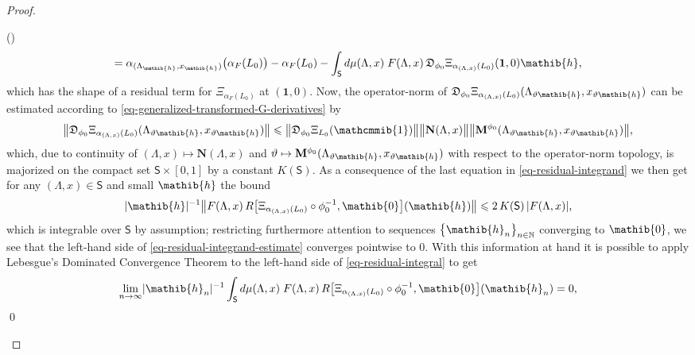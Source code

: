 \documentclass[11pt,twoside,openright]{report}
\theoremstyle{definition}
\theoremstyle{plain}
\theoremstyle{remark}
\theoremstyle{assumption}
\newcommand{\bset}[1]{\bigl\{ #1 \bigr\}}
\newcommand{\abs}[1]{\lvert #1 \rvert}
\newcommand{\bnorm}[1]{\bigl\lVert #1 \bigr\rVert}
\newcommand{\Nbb}{\mathbb{N}}
\newcommand{\Mbf}{\mathbf{M}}
\newcommand{\Nbf}{\mathbf{N}}
\newcommand{\Dfrak}{\mathfrak{D}}
\newcommand{\zeroib}{\mathib{0}}
\newcommand{\hib}{\mathib{h}}
\newcommand{\Ssf}{\mathsf{S}}
\newcommand{\neutral}{\mathcmmib{1}}
\newcommand{\unit}{\mathbf{1}}
\newcommand{\aLax}{\alpha_{( \Lambda , x )}}
\newcounter{proofitem}
\newenvironment{prooflist}{\begin{list}{(\roman{proofitem})}%
  {\usecounter{proofitem} \setlength{\topsep}{0ex}%
   \setlength{\parsep}{0.2ex} \setlength{\itemsep}{0.4ex}%
   \setlength{\leftmargin}{0em} \setlength{\itemindent}{0.5em}%
   \setlength{\listparindent}{1em}}}{\qed \end{list}}
\begin{document}
\begin{proof}
\begin{prooflist}
\begin{multline}
      = \alpha_{( \Lambda_\hib , x_\hib )} \bigl( \alpha_F ( L_0 )
      \bigr) - \alpha_F ( L_0 ) - \int_\Ssf d \mu ( \Lambda , x ) \; F
      ( \Lambda , x ) \, \Dfrak_{\phi_0} \Xi_{\aLax ( L_0 )} ( \unit ,
      0 ) \hib \text{,}
    \end{multline}
    which has the shape of a residual term for $\Xi_{\alpha_F ( L_0
    )}$ at $( \unit , 0 )$. Now, the operator-norm of $\Dfrak_{\phi_0}
    \Xi_{\aLax ( L_0 )} ( \Lambda_{\vartheta \hib} , x_{\vartheta
    \hib} )$ can be estimated according to 
    \eqref{eq-generalized-transformed-G-derivatives} by 
    \begin{equation*}
      \bnorm{\Dfrak_{\phi_0} \Xi_{\aLax ( L_0 )} ( \Lambda_{\vartheta
      \hib} , x_{\vartheta \hib} )} \leqslant \bnorm{\Dfrak_{\phi_0} 
      \Xi_{L_0} ( \neutral )} \bnorm{\Nbf ( \Lambda , x )}
      \bnorm{\Mbf^{\phi_0} ( \Lambda_{\vartheta \hib} , x_{\vartheta
      \hib} )} \text{,}
    \end{equation*}
    which, due to continuity of $( \Lambda , x ) \mapsto \Nbf (
    \Lambda , x )$ and $\vartheta \mapsto \Mbf^{\phi_0} (
    \Lambda_{\vartheta \hib} , x_{\vartheta \hib} )$ with respect to 
    the operator-norm topology, is majorized on the compact set $\Ssf
    \times [ 0 , 1 ]$ by a constant $K ( \Ssf )$. As a consequence of
    the last equation in \eqref{eq-residual-integrand} we then get for
    any $( \Lambda , x ) \in \Ssf$ and small $\hib$ the bound
    \begin{equation}
      \label{eq-residual-integrand-estimate}
      \abs{\hib}^{-1} \bnorm{F ( \Lambda , x ) \, R \bigl[ \Xi_{\aLax
      ( L_0 )} \circ \phi_0^{-1} , \zeroib \bigr] ( \hib )} \leqslant
      2 \, K ( \Ssf ) \, \abs{F ( \Lambda , x )} \text{,}
    \end{equation}
    which is integrable over $\Ssf$ by assumption; restricting
    furthermore attention to sequences $\bset{\hib_n}_{n \in \Nbb}$
    converging to $\zeroib$, we see that the left-hand side of
    \eqref{eq-residual-integrand-estimate} converges pointwise to $0$.
    With this information at hand it is possible to apply Lebesgue's
    Dominated Convergence Theorem \cite[II.5.6]{fell/doran:1988a} to
    the left-hand side of \eqref{eq-residual-integral} to get
    \begin{equation}
      \label{eq-residual-integral-condition}
      \lim_{n \rightarrow \infty} \abs{\hib_n}^{-1} \int_\Ssf d \mu (
      \Lambda , x ) \; F ( \Lambda , x ) \, R \bigl[ \Xi_{\aLax ( L_0
      )} \circ \phi_0^{-1} , \zeroib \bigr] ( \hib_n ) = 0 \text{,}

\end{equation}
\end{prooflist}
\end{proof}
\end{document}
